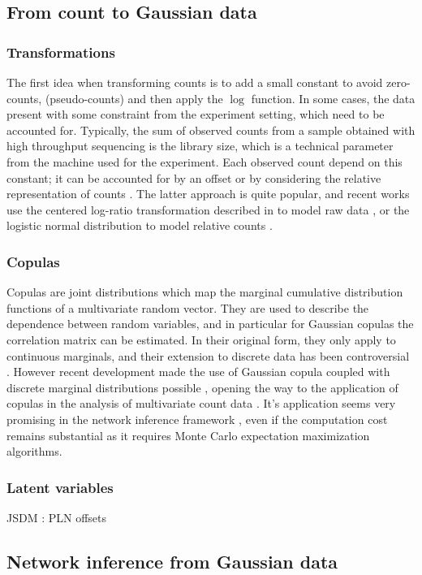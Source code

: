 \subsection{From count to Gaussian data} 
\subsubsection{Transformations}
The first idea when transforming counts is to add a small constant to avoid zero-counts, (pseudo-counts) and then apply the $\log$ function. In some cases, the data present with some constraint from the experiment setting, which need to be accounted for.
Typically, the sum of observed counts from a sample obtained with high throughput sequencing is the library size, which is a technical parameter from the machine used for the experiment. Each observed count depend on this constant; it can be accounted for by an offset or by considering the relative representation of counts \citet{GMP17}. The latter approach is quite popular, and recent works use the centered log-ratio transformation described in \citet{A82} to model raw data \citep{kurtz}, or the logistic normal distribution \citep{AS80} to model relative counts \citep{gcoda}.
\subsubsection{Copulas}
Copulas are  joint  distributions which map the marginal  cumulative distribution functions of a multivariate random vector. They are used to describe the dependence between random variables, and in particular for Gaussian copulas the correlation matrix can be estimated. In their original form, they only apply to continuous marginals, and their extension to discrete data has been controversial \citep{F17}. However recent development made the use of  Gaussian copula coupled with discrete marginal distributions possible \citep{PHW18}, opening the way to the application of copulas in the analysis of multivariate count data \citep{AVP19}. It's application seems very promising in the network inference framework \citep{PWT19}, even if the computation cost remains substantial as it requires  Monte Carlo expectation maximization algorithms.

\subsubsection{Latent variables}
 JSDM : PLN offsets
 
\subsection{Network inference from Gaussian data}
